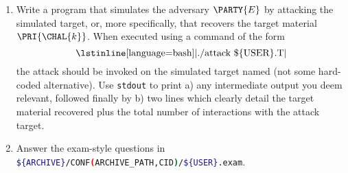 

\begin{enumerate}
\item Write a program that simulates the adversary $\PARTY{E}$ by attacking
      the simulated target, or, more specifically, that recovers the target 
      material $\PRI{\CHAL{k}}$.  
      When executed using a command of the form
      \[
      \mbox{\lstinline[language={bash}]|./attack \$\{USER\}.T|}
      \]
      the attack should be invoked on the simulated target named (not some
      hard-coded alternative).  Use \lstinline[language={bash}]{stdout} to 
      print 
      a) any intermediate output you deem relevant, followed finally by 
      b) two lines which clearly detail the target material recovered plus
         the total number of interactions with the attack target.
\item Answer the exam-style questions in 
      \lstinline[language={bash}]|${ARCHIVE}/CONF(ARCHIVE_PATH,CID)/${USER}.exam|.
\end{enumerate}

